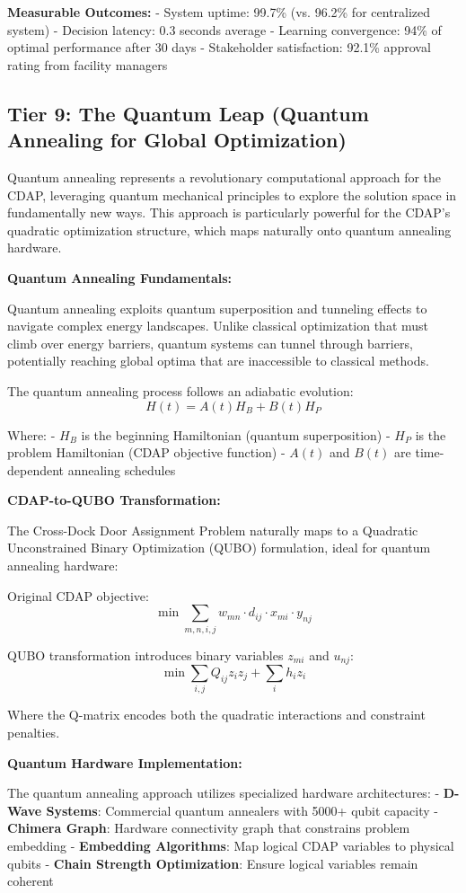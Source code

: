 \documentclass{article}
\begin{document}
\textbf{Measurable Outcomes:}
- System uptime: 99.7\% (vs. 96.2\% for centralized system)
- Decision latency: 0.3 seconds average
- Learning convergence: 94\% of optimal performance after 30 days
- Stakeholder satisfaction: 92.1\% approval rating from facility managers

\subsection{Tier 9: The Quantum Leap (Quantum Annealing for Global Optimization)}

Quantum annealing represents a revolutionary computational approach for the CDAP, leveraging quantum mechanical principles to explore the solution space in fundamentally new ways. This approach is particularly powerful for the CDAP's quadratic optimization structure, which maps naturally onto quantum annealing hardware.

\textbf{Quantum Annealing Fundamentals:}

Quantum annealing exploits quantum superposition and tunneling effects to navigate complex energy landscapes. Unlike classical optimization that must climb over energy barriers, quantum systems can tunnel through barriers, potentially reaching global optima that are inaccessible to classical methods.

The quantum annealing process follows an adiabatic evolution:
\[
H(t) = A(t)H_B + B(t)H_P
\]

Where:
- $H_B$ is the beginning Hamiltonian (quantum superposition)
- $H_P$ is the problem Hamiltonian (CDAP objective function)
- $A(t)$ and $B(t)$ are time-dependent annealing schedules

\textbf{CDAP-to-QUBO Transformation:}

The Cross-Dock Door Assignment Problem naturally maps to a Quadratic Unconstrained Binary Optimization (QUBO) formulation, ideal for quantum annealing hardware:

Original CDAP objective:
\[
\min \sum_{m,n,i,j} w_{mn} \cdot d_{ij} \cdot x_{mi} \cdot y_{nj}
\]

QUBO transformation introduces binary variables $z_{mi}$ and $u_{nj}$:
\[
\min \sum_{i,j} Q_{ij} z_i z_j + \sum_i h_i z_i
\]

Where the Q-matrix encodes both the quadratic interactions and constraint penalties.

\textbf{Quantum Hardware Implementation:}

The quantum annealing approach utilizes specialized hardware architectures:
- \textbf{D-Wave Systems}: Commercial quantum annealers with 5000+ qubit capacity
- \textbf{Chimera Graph}: Hardware connectivity graph that constrains problem embedding
- \textbf{Embedding Algorithms}: Map logical CDAP variables to physical qubits
- \textbf{Chain Strength Optimization}: Ensure logical variables remain coherent
\end{document}
